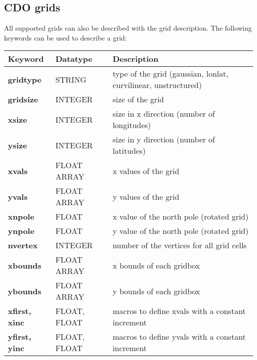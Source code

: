 \subsection{CDO grids}

All supported grids can also be described with the {\CDO} grid description.
The following keywords can be used to describe a grid:

\vspace{3mm}
\begin{tabular}[b]{lll}
Keyword           & Datatype     & Description \\ \hline
\bf{gridtype}     & STRING       & type of the grid (gaussian, lonlat, curvilinear, unstructured) \\
\bf{gridsize}     & INTEGER      & size of the grid \\
\bf{xsize}        & INTEGER      & size in x direction (number of longitudes) \\
\bf{ysize}        & INTEGER      & size in y direction (number of latitudes) \\
\bf{xvals}        & FLOAT ARRAY  & x values of the grid \\
\bf{yvals}        & FLOAT ARRAY  & y values of the grid \\
\bf{xnpole}       & FLOAT        & x value of the north pole (rotated grid) \\
\bf{ynpole}       & FLOAT        & y value of the north pole (rotated grid) \\
\bf{nvertex}      & INTEGER      & number of the vertices for all grid cells \\
\bf{xbounds}      & FLOAT ARRAY  & x bounds of each gridbox \\
\bf{ybounds}      & FLOAT ARRAY  & y bounds of each gridbox \\
\bf{xfirst, xinc} & FLOAT, FLOAT & macros to define xvals with a constant increment \\
\bf{yfirst, yinc} & FLOAT, FLOAT & macros to define yvals with a constant increment \\
\end{tabular}

